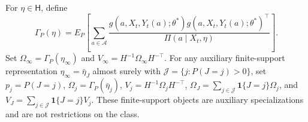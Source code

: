 For \(\eta\in\mathsf H\), define
\[
 \Gamma_P(\eta)=E_P\!\left[\sum_{a\in\mathcal A}
 \frac{g(a,X_t,Y_t(a);\theta^*)g(a,X_t,Y_t(a);\theta^*)^\top}
 {\Pi(a\mid X_t,\eta)}\right].
\]
Set \(\Omega_\infty=\Gamma_P(\eta_\infty)\) and \(V_\infty=H^{-1}\Omega_\infty H^{-\top}\). For any auxiliary finite-support representation \(\eta_\infty=\bar\eta_J\) almost surely with \(\mathcal J=\{j:P(J=j)>0\}\), set \(p_j=P(J=j)\), \(\Omega_j=\Gamma_P(\bar\eta_j)\), \(V_j=H^{-1}\Omega_jH^{-\top}\), \(\Omega_J=\sum_{j\in\mathcal J}\mathbf 1\{J=j\}\Omega_j\), and \(V_J=\sum_{j\in\mathcal J}\mathbf 1\{J=j\}V_j\). These finite-support objects are auxiliary specializations and are not restrictions on the class.